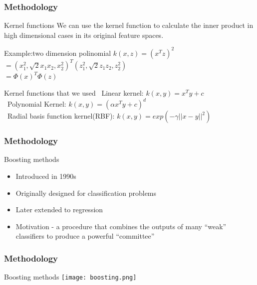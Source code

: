 \documentclass[xcolor={x11names,svgnames,dvipsnames}]{beamer}
\begin{document}
\begin{frame}
\frametitle{Methodology}
\begin{block}{Kernel functions}
We can use the kernel function to calculate the inner product in high dimensional cases in its original feature spaces.
\end{block}
\begin{block}{Example:two dimension polinomial}
$k(x,z)=(x^Tz)^2$\\
$=(x_1^2,\sqrt{2}x_1x_2,x_2^2)^T(z_1^2,\sqrt{2}z_1z_2,z_2^2)$\\
$=\Phi(x)^T\Phi(z)$\\
\end{block}
\begin{block}{Kernel functions that we used}
\small{
\textbullet\ {Linear kernel:  $k(x,y)=x^Ty+c$}\\
\textbullet\ {Polynomial Kernel:  $k(x,y)=(\alpha x^Ty+c)^d$}\\
\textbullet\ {Radial basis function kernel(RBF):  $k(x,y)=exp(-\gamma||x-y||^2)$}
}
\end{block}
\end{frame}

\begin{frame}
	\frametitle{Methodology}
	\begin{block}{Boosting methods}
	  \begin{itemize}
	  \item Introduced in 1990s
	  \item Originally designed for classification problems
	  \item Later extended to regression
	  \item Motivation - a procedure that \alert{combines the outputs of many “weak” classifiers to produce a powerful “committee”}	  
	  \end{itemize}
	\end{block}
\end{frame}

\begin{frame}
	\frametitle{Methodology}
	\begin{block}{Boosting methods}
      \texttt{[image: boosting.png]}
	\end{block}	
\end{frame}
\end{document}

